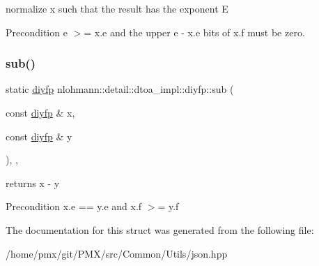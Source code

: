 normalize x such that the result has the exponent E 

\begin{DoxyPrecond}{Precondition}
e $>$= x.\+e and the upper e -\/ x.\+e bits of x.\+f must be zero. 
\end{DoxyPrecond}
\mbox{\label{structnlohmann_1_1detail_1_1dtoa__impl_1_1diyfp_aeb26771af54ad73598c1a0430d65d884}} 
\subsubsection{\texorpdfstring{sub()}{sub()}}
{\footnotesize\ttfamily static \hyperlink{structnlohmann_1_1detail_1_1dtoa__impl_1_1diyfp}{diyfp} nlohmann\+::detail\+::dtoa\+\_\+impl\+::diyfp\+::sub (\begin{DoxyParamCaption}\item[{const \hyperlink{structnlohmann_1_1detail_1_1dtoa__impl_1_1diyfp}{diyfp} \&}]{x,  }\item[{const \hyperlink{structnlohmann_1_1detail_1_1dtoa__impl_1_1diyfp}{diyfp} \&}]{y }\end{DoxyParamCaption})\hspace{0.3cm}{\ttfamily [inline]}, {\ttfamily [static]}, {\ttfamily [noexcept]}}



returns x -\/ y 

\begin{DoxyPrecond}{Precondition}
x.\+e == y.\+e and x.\+f $>$= y.\+f 
\end{DoxyPrecond}


The documentation for this struct was generated from the following file\+:\begin{DoxyCompactItemize}
\item 
/home/pmx/git/\+P\+M\+X/src/\+Common/\+Utils/json.\+hpp\end{DoxyCompactItemize}
